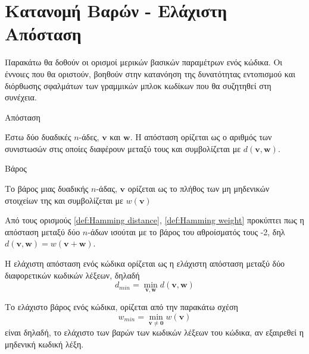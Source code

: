 \section{Κατανομή Βαρών - Ελάχιστη Απόσταση }

Παρακάτω θα δοθούν οι ορισμοί μερικών βασικών παραμέτρων ενός κώδικα. Οι έννοιες που θα οριστούν, βοηθούν στην κατανόηση της δυνατότητας εντοπισμού και διόρθωσης σφαλμάτων των γραμμικών μπλοκ κωδίκων που θα συζητηθεί στη συνέχεια.

\begin{definition}Απόσταση 

Έστω δύο δυαδικές $n$-άδες, $\mathbf{v}$ και $\mathbf{w}$. Η απόσταση  ορίζεται ως ο αριθμός των συνιστωσών στις οποίες διαφέρουν μεταξύ τους και συμβολίζεται με $d\left(\mathbf{v},\mathbf{w}\right)$.
\label{def:Hamming distance}
\end{definition}

\begin{definition}Βάρος 

Το βάρος  μιας δυαδικής $n$-άδας, $\mathbf{v}$ ορίζεται ως το πλήθος των μη μηδενικών στοιχείων της και συμβολίζεται με $w\left(\mathbf{v}\right)$
\label{def:Hamming weight}
\end{definition}

Από τους ορισμούς \ref{def:Hamming distance}, \ref{def:Hamming weight} προκύπτει πως η απόσταση  μεταξύ δύο $n$-άδων ισούται με το βάρος του αθροίσματός τους -2, δηλ $d\left(\mathbf{v},\mathbf{w}\right) = w\left(\mathbf{v}+\mathbf{w}\right)$.

\begin{definition}
Η ελάχιστη απόσταση ενός κώδικα ορίζεται ως η ελάχιστη απόσταση  μεταξύ δύο διαφορετικών κωδικών λέξεων, δηλαδή
\begin{equation}
d_{min} = \min_{\mathbf{v}, \mathbf{w}}d\left(\mathbf{v}, \mathbf{w}\right)
\label{eq:min distance}
\end{equation}
\end{definition}

\begin{definition}
Το ελάχιστο βάρος ενός κώδικα, ορίζεται από την παρακάτω σχέση
\begin{equation}
w_{min} = \min_{\mathbf{v}\neq\mathbf{0}}w\left(\mathbf{v}\right)
\label{eq:min weight}
\end{equation}
είναι δηλαδή, το ελάχιστο των βαρών των κωδικών λέξεων του κώδικα, αν εξαιρεθεί η μηδενική κωδική λέξη.
\end{definition}

